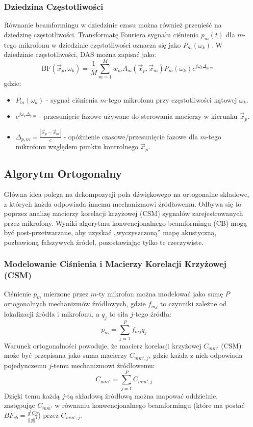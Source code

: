 \documentclass[12pt]{article}
\begin{document}
\subsubsection{Dziedzina Częstotliwości}
Równanie beamformingu w dziedzinie czasu można również przenieść na dziedzinę częstotliwości. Transformatę Fouriera sygnału ciśnienia $p_m(t)$ dla $m$-tego mikrofonu w dziedzinie częstotliwości oznacza się jako $P_m(\omega_k)$. W dziedzinie częstotliwości, DAS można zapisać jako:
\begin{equation}
\label{eq:das_freq}
\text{BF}(\vec{x}_p, \omega_k) = \frac{1}{M} \sum_{m=1}^{M} w_m A_m(\vec{x}_p, \vec{x}_m) P_m(\omega_k) e^{j\omega_k \Delta_{p,m}}
\end{equation}
gdzie:
\begin{itemize}
    \item $P_m(\omega_k)$ - sygnał ciśnienia $m$-tego mikrofonu przy częstotliwości kątowej $\omega_k$.
    \item $e^{j\omega_k \Delta_{p,m}}$ - przesunięcie fazowe używane do sterowania macierzy w kierunku $\vec{x}_p$.
    \item $\Delta_{p,m} = \frac{|\vec{x}_p - \vec{x}_m|}{c}$ - opóźnienie czasowe/przesunięcie fazowe dla $m$-tego mikrofonu względem punktu kontrolnego $\vec{x}_p$.
\end{itemize}


\subsection{Algorytm Ortogonalny}
Główna idea polega na dekompozycji pola dźwiękowego na ortogonalne składowe, z których każda odpowiada innemu mechanizmowi źródłowemu. Odbywa się to poprzez analizę macierzy korelacji krzyżowej (CSM) sygnałów zarejestrowanych przez mikrofony. Wyniki algorytmu konwencjonalnego beamformingu (CB) mogą być post-przetwarzane, aby uzyskać „wyczyszczoną” mapę akustyczną, pozbawioną fałszywych źródeł, pozostawiając tylko te rzeczywiste.

\subsubsection{Modelowanie Ciśnienia i Macierzy Korelacji Krzyżowej (CSM)}
Ciśnienie $p_m$ mierzone przez $m$-ty mikrofon można modelować jako sumę $P$ ortogonalnych mechanizmów źródłowych, gdzie $f_{mj}$ to czynniki zależne od lokalizacji źródła i mikrofonu, a $q_j$ to siła $j$-tego źródła:
\begin{equation}
p_m = \sum_{j=1}^{P} f_{mj} q_j \quad \text{}
\end{equation}
Warunek ortogonalności powoduje, że macierz korelacji krzyżowej $C_{mm'}$ (CSM) może być przepisana jako suma macierzy $C_{mm',j}$, gdzie każda z nich odpowiada pojedynczemu $j$-temu mechanizmowi źródłowemu:
\begin{equation}
C_{mm'} = \sum_{j=1}^{P} C_{mm',j} \quad \text{}
\end{equation}
Dzięki temu każdą $j$-tą składową źródłową można mapować oddzielnie, zastępując $C_{mm'}$ w równaniu konwencjonalnego beamformingu (które ma postać $BF_{cb} = \frac{g^\dagger C g}{||g||^4}$) przez $C_{mm',j}$.
\end{document}
